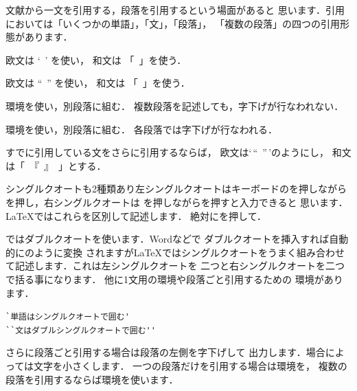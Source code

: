 {
%
文献から一文を引用する，段落を引用するという場面があると
思います．引用においては「いくつかの単語」，「文」，「段落」，
「複数の段落」の四つの引用形態があります．
\begin{description}

 \item[単語の引用]
   欧文は `~' を使い，
   和文は 「~」を使う．

 \item[文の引用]  
   欧文は ``~'' を使い，
   和文は 「~」を使う．

 \item[段落の引用]  
   環境を使い，別段落に組む．
   複数段落を記述しても，字下げが行なわれない．

 \item[複数段落の引用]  
   環境を使い，別段落に組む．
   各段落では字下げが行なわれる．
 \item[引用の引用]
   すでに引用している文をさらに引用するならば，
  欧文は`\,``~''\,'のようにし，
  和文は「~『~』~」とする．
\end{description}

シングルクオートも2種類あり左シングルクオートはキーボードのを押しながら
を押し，右シングルクオートは
を押しながらを押すと入力できると
思います．{\LaTeX}ではこれらを区別して記述します．
絶対にを押して．

%
ではダブルクオートを使います．{Word}などで
ダブルクオートを挿入すれば自動的にのように変換
されますが{\LaTeX}ではシングルクオートをうまく組み合わせ
て記述します．これは左シングルクオートを
二つと右シングルクオートを二つで括る事になります．
他に1文用の環境や段落ごと引用するための
環境があります．
\begin{Syntax}
\verb|`単語はシングルクオートで囲む'|\\
\verb|``文はダブルシングルクオートで囲む''|
\end{Syntax}
さらに段落ごと引用する場合は段落の左側を字下げして
出力します．場合によっては文字を小さくします．
一つの段落だけを引用する場合は環境を，
複数の段落を引用するならば環境を使います．

}
